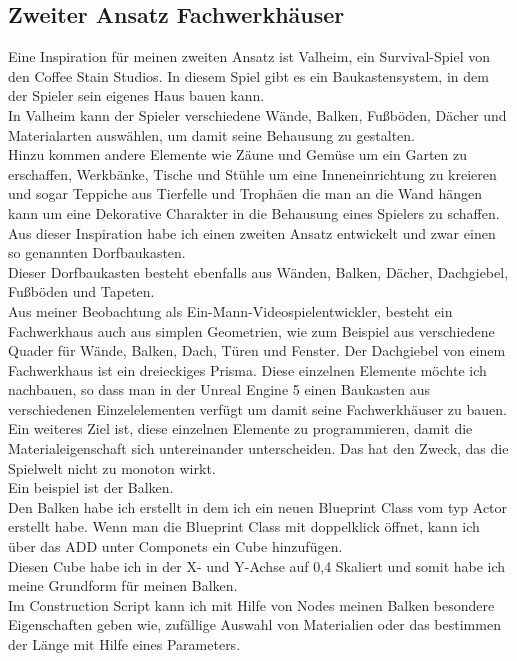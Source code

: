 \subsection{Zweiter Ansatz Fachwerkhäuser}%
Eine Inspiration für meinen zweiten Ansatz ist Valheim, ein Survival-Spiel von den Coffee Stain Studios. In diesem Spiel gibt es ein Baukastensystem, in dem der Spieler sein eigenes Haus bauen kann.
\\
In Valheim kann der Spieler verschiedene Wände, Balken, Fußböden, Dächer und Materialarten auswählen, um damit seine Behausung zu gestalten.
\\
Hinzu kommen andere Elemente wie Zäune und Gemüse um ein Garten zu erschaffen, Werkbänke, Tische und Stühle um eine Inneneinrichtung zu kreieren und sogar Teppiche aus Tierfelle und Trophäen die man an die Wand hängen kann um eine Dekorative Charakter in die Behausung eines Spielers zu schaffen.
\\
Aus dieser Inspiration habe ich einen zweiten Ansatz entwickelt und zwar einen so genannten Dorfbaukasten.
\\
Dieser Dorfbaukasten besteht ebenfalls aus Wänden, Balken, Dächer, Dachgiebel, Fußböden und Tapeten.
\\
Aus meiner Beobachtung als Ein-Mann-Videospielentwickler, besteht ein Fachwerkhaus auch aus simplen Geometrien, wie zum Beispiel aus verschiedene Quader für Wände, Balken, Dach, Türen und Fenster. Der Dachgiebel von einem Fachwerkhaus ist ein dreieckiges Prisma. Diese einzelnen Elemente möchte ich nachbauen, so dass man in der Unreal Engine 5 einen Baukasten aus verschiedenen Einzelelementen verfügt um damit seine Fachwerkhäuser zu bauen. 
\\
Ein weiteres Ziel ist, diese einzelnen Elemente zu programmieren, damit die Materialeigenschaft sich untereinander unterscheiden. Das hat den Zweck, das die Spielwelt nicht zu monoton wirkt.
\\
Ein beispiel ist der Balken.
\\
Den Balken habe ich erstellt in dem ich ein neuen Blueprint Class vom typ Actor erstellt habe. Wenn man die Blueprint Class mit doppelklick öffnet, kann ich über das ADD unter Componets ein Cube hinzufügen.
\\
Diesen Cube habe ich in der X- und Y-Achse auf 0,4 Skaliert und somit habe ich meine Grundform für meinen Balken.
\\
Im Construction Script kann ich mit Hilfe von Nodes meinen Balken besondere Eigenschaften geben wie, zufällige Auswahl von Materialien oder das bestimmen der Länge mit Hilfe eines Parameters.
